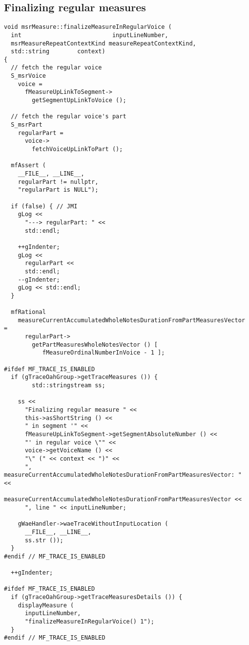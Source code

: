 \subsection{Finalizing regular measures}

\begin{lstlisting}[language=CPlusPlus]
void msrMeasure::finalizeMeasureInRegularVoice (
  int                          inputLineNumber,
  msrMeasureRepeatContextKind measureRepeatContextKind,
  std::string        context)
{
  // fetch the regular voice
  S_msrVoice
    voice =
      fMeasureUpLinkToSegment->
        getSegmentUpLinkToVoice ();

  // fetch the regular voice's part
  S_msrPart
    regularPart =
      voice->
        fetchVoiceUpLinkToPart ();

  mfAssert (
    __FILE__, __LINE__,
    regularPart != nullptr,
    "regularPart is NULL");

  if (false) { // JMI
    gLog <<
      "---> regularPart: " <<
      std::endl;

    ++gIndenter;
    gLog <<
      regularPart <<
      std::endl;
    --gIndenter;
    gLog << std::endl;
  }

  mfRational
    measureCurrentAccumulatedWholeNotesDurationFromPartMeasuresVector =
      regularPart->
        getPartMeasuresWholeNotesVector () [
           fMeasureOrdinalNumberInVoice - 1 ];

#ifdef MF_TRACE_IS_ENABLED
  if (gTraceOahGroup->getTraceMeasures ()) {
		std::stringstream ss;

    ss <<
      "Finalizing regular measure " <<
      this->asShortString () <<
      " in segment '" <<
      fMeasureUpLinkToSegment->getSegmentAbsoluteNumber () <<
      "' in regular voice \"" <<
      voice->getVoiceName () <<
      "\" (" << context << ")" <<
      ", measureCurrentAccumulatedWholeNotesDurationFromPartMeasuresVector: " <<
      measureCurrentAccumulatedWholeNotesDurationFromPartMeasuresVector <<
      ", line " << inputLineNumber;

    gWaeHandler->waeTraceWithoutInputLocation (
      __FILE__, __LINE__,
      ss.str ());
  }
#endif // MF_TRACE_IS_ENABLED

  ++gIndenter;

#ifdef MF_TRACE_IS_ENABLED
  if (gTraceOahGroup->getTraceMeasuresDetails ()) {
    displayMeasure (
      inputLineNumber,
      "finalizeMeasureInRegularVoice() 1");
  }
#endif // MF_TRACE_IS_ENABLED


\end{lstlisting}
